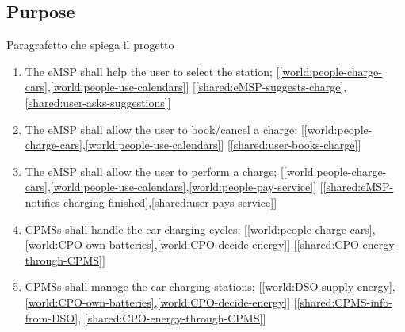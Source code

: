 


\subsection{Purpose}
Paragrafetto che spiega il progetto

%
\begin{enumerate}[label=G\arabic*]
    \item The \ac{eMSP} shall help the user to select the station; \label{goal:eMSP-helps-selecting} [\ref{world:people-charge-cars},\ref{world:people-use-calendars}] [\ref{shared:eMSP-suggests-charge},\ref{shared:user-asks-suggestions}]
    \item The \ac{eMSP} shall allow the user to book/cancel a charge; \label{goal:eMSP-booking-charge} [\ref{world:people-charge-cars},\ref{world:people-use-calendars}] [\ref{shared:user-books-charge}]
    \item The \ac{eMSP} shall allow the user to perform a charge; \label{goal:eMSP-allow-charge} [\ref{world:people-charge-cars},\ref{world:people-use-calendars},\ref{world:people-pay-service}] [\ref{shared:eMSP-notifies-charging-finished},\ref{shared:user-pays-service}]
    \item \acp{CPMS} shall handle the car charging cycles; \label{goal:CPMS-handles-charge} [\ref{world:people-charge-cars},\ref{world:CPO-own-batteries},\ref{world:CPO-decide-energy}] [\ref{shared:CPO-energy-through-CPMS}]
    \item \acp{CPMS} shall manage the car charging stations; \label{goal:CPMS-manage-station} [\ref{world:DSO-supply-energy},\ref{world:CPO-own-batteries},\ref{world:CPO-decide-energy}] [\ref{shared:CPMS-info-from-DSO}, \ref{shared:CPO-energy-through-CPMS}]
\end{enumerate}

